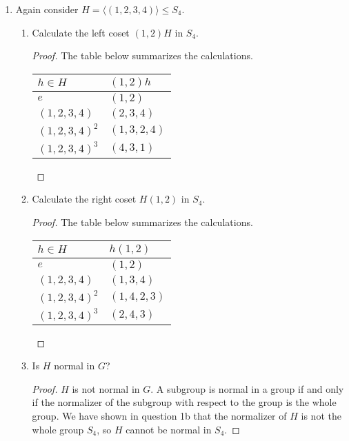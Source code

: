 \documentclass{article}
\begin{document}
\begin{enumerate}
  \item Again consider $H=\langle(1,2,3,4)\rangle\leq S_4$.
    \begin{enumerate}
      \item Calculate the left coset $(1,2)H$ in $S_4$.
        \begin{proof}
          The table below summarizes the calculations.
          \begin{center}
            \begin{tabular}{|l|l|}
              \hline
              $h\in H$      & $(1,2)h$    \\ \hline\hline
              $e$           & $(1,2)$     \\ \hline
              $(1,2,3,4)$   & $(2,3,4)$   \\ \hline
              $(1,2,3,4)^2$ & $(1,3,2,4)$ \\ \hline
              $(1,2,3,4)^3$ & $(4,3,1)$   \\ \hline
            \end{tabular}
          \end{center}
        \end{proof}

      \item Calculate the right coset $H(1,2)$ in $S_4$.
        \begin{proof}
          The table below summarizes the calculations.
          \begin{center}
            \begin{tabular}{|l|l|}
              \hline
              $h\in H$      & $h(1,2)$    \\ \hline\hline
              $e$           & $(1,2)$     \\ \hline
              $(1,2,3,4)$   & $(1,3,4)$   \\ \hline
              $(1,2,3,4)^2$ & $(1,4,2,3)$ \\ \hline
              $(1,2,3,4)^3$ & $(2,4,3)$   \\ \hline
            \end{tabular}
          \end{center}
        \end{proof}

      \item Is $H$ normal in $G$?
        \begin{proof}
          $H$ is not normal in $G$. A subgroup is normal in a group if and
          only if the normalizer of the subgroup with respect to the group
          is the whole group. We have shown in question 1b that the
          normalizer of $H$ is not the whole group $S_4$, so $H$ cannot be
          normal in $S_4$.
        \end{proof}
    \end{enumerate}


\end{enumerate}
\end{document}

